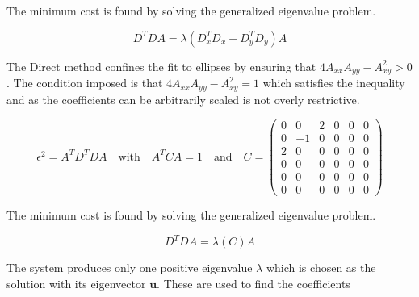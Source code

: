 The minimum cost is found by solving the generalized eigenvalue problem.

\begin{equation*}
 D^T D A = \lambda  \left( D_x^T D_x +  D_y^T D_y\right) A 
\end{equation*}

The Direct method confines the fit to ellipses by ensuring that $4 A_{xx} A_{yy}- A_{xy}^2 > 0$. The condition imposed is that $4 A_{xx} A_{yy}- A_{xy}^2=1$ which satisfies the inequality and as the coefficients can be arbitrarily scaled is not overly restrictive.

\begin{equation*}
\epsilon ^2= A^T D^T D A \quad \text{with} \quad A^T C A =1 \quad \text{and} \quad C=\left(\begin{matrix}
 0 & 0  & 2  & 0  & 0  &  0  \\ 
 0 & -1  & 0  & 0  & 0  &  0 \\ 
 2 & 0  & 0  & 0  & 0  &  0 \\ 
 0 & 0  & 0  & 0  & 0  &  0 \\ 
 0 & 0  & 0  & 0  & 0  &  0 \\ 
 0 & 0  & 0  & 0  & 0  &  0 
\end{matrix} \right)
\end{equation*}

The minimum cost is found by solving the generalized eigenvalue problem.

\begin{equation*}
 D^T D A = \lambda  \left( C\right) A 
\end{equation*}

The system produces only one positive eigenvalue $ \lambda$ which is chosen as the solution with its eigenvector $\mathbf{u}$. These are used to find the coefficients

